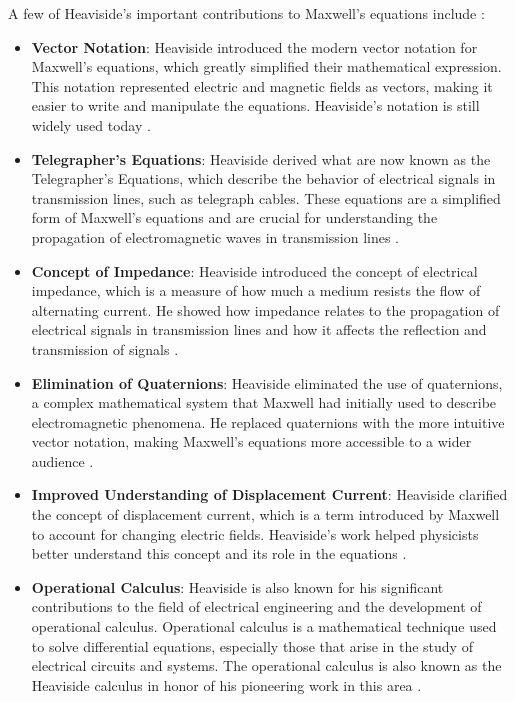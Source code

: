 \documentclass{article}
\theoremstyle{definition}
\begin{document}
\bigskip
\noindent
A few of Heaviside's important contributions to Maxwell's 
equations include \cite{the_long_road_to_maxwells_equations,
wikipedia:history_of_maxwells_equations}:

\medskip
\begin{itemize}
\item {\bf Vector Notation}: Heaviside introduced the modern
vector notation for Maxwell's equations, which greatly simplified
their mathematical expression. This notation represented electric
and magnetic fields as vectors, making it easier to write and
manipulate the equations. Heaviside's notation is still widely
used today \cite{dmm:vector_calculus}.

\item {\bf Telegrapher's Equations}: Heaviside derived what are
now known as the Telegrapher's Equations, which describe the
behavior of electrical signals in transmission lines, such as
telegraph cables. These equations are a simplified form of
Maxwell's equations and are crucial for understanding the
propagation of electromagnetic waves in transmission lines
\cite{wikipedia:telegraphers_equations}.

\item {\bf Concept of Impedance}: Heaviside introduced the
concept of electrical impedance, which is a measure of how much a
medium resists the flow of alternating current. He showed how
impedance relates to the propagation of electrical signals in
transmission lines and how it affects the reflection and
transmission of signals \cite{impedance}.

\item {\bf Elimination of Quaternions}: Heaviside eliminated the
use of quaternions, a complex mathematical system that Maxwell
had initially used to describe electromagnetic phenomena. He
replaced quaternions with the more intuitive vector notation,
making Maxwell's equations more accessible to a wider audience
\cite{quaternion}.

\item {\bf Improved Understanding of Displacement Current}:
Heaviside clarified the concept of displacement current, which is
a term introduced by Maxwell to account for changing electric
fields. Heaviside's work helped physicists better understand this
concept and its role in the equations
\cite{wikipedia:displacement_current}.

\item {\bf Operational Calculus}: Heaviside is also known for his
significant contributions to the field of electrical engineering
and the development of operational calculus. Operational calculus
is a mathematical technique used to solve differential equations,
especially those that arise in the study of electrical circuits
and systems. The operational calculus is also known as the 
Heaviside calculus in honor of his pioneering work in this area  
\cite{wikipedia:operational_calculus}.


\end{itemize}
\end{document}
